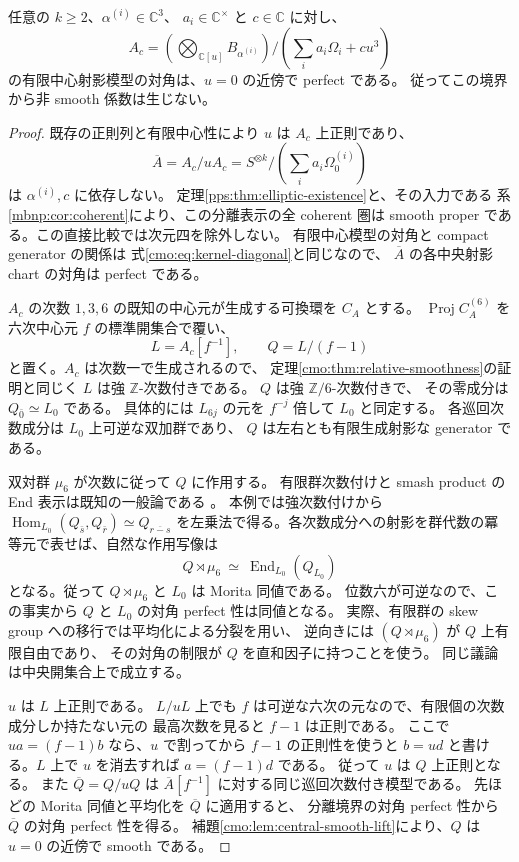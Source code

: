 \begin{proposition}[定数型混合族の全係数における射影境界]
\label{cmo:prop:projective-boundary-smooth}
任意の $k\ge2$、$\alpha^{(i)}\in\mathbb C^3$、
$a_i\in\mathbb C^\times$ と $c\in\mathbb C$ に対し、
\[
 A_c=\left(\bigotimes_{\mathbb C[u]}B_{\alpha^{(i)}}\right)
       \Big/\left(\sum_i a_i\Omega_i+cu^3\right)
\]
の有限中心射影模型の対角は、$u=0$ の近傍で perfect である。
従ってこの境界から非 smooth 係数は生じない。
\end{proposition}
\begin{proof}
既存の正則列と有限中心性により $u$ は $A_c$ 上正則であり、
\[
 \overline A=A_c/uA_c
   =S^{\otimes k}/\left(\sum_i a_i\Omega_0^{(i)}\right)
\]
は $\alpha^{(i)},c$ に依存しない。
定理\ref{pps:thm:elliptic-existence}と、その入力である
系\ref{mbnp:cor:coherent}により、この分離表示の全 coherent 圏は
smooth proper である。この直接比較では次元四を除外しない。
有限中心模型の対角と compact generator の関係は
式\eqref{cmo:eq:kernel-diagonal}と同じなので、
$\overline A$ の各中央射影 chart の対角は perfect である。

$A_c$ の次数 $1,3,6$ の既知の中心元が生成する可換環を $C_A$ とする。
$\operatorname{Proj}C_A^{(6)}$ を六次中心元 $f$ の標準開集合で覆い、
\[
 L=A_c[f^{-1}],\qquad Q=L/(f-1)
\]
と置く。$A_c$ は次数一で生成されるので、
定理\ref{cmo:thm:relative-smoothness}の証明と同じく $L$ は強 $\mathbb Z$-次数付きである。
$Q$ は強 $\mathbb Z/6$-次数付きで、
その零成分は $Q_{\bar0}\simeq L_0$ である。
具体的には $L_{6j}$ の元を $f^{-j}$ 倍して $L_0$ と同定する。
各巡回次数成分は $L_0$ 上可逆な双加群であり、
$Q$ は左右とも有限生成射影な generator である。

双対群 $\mu_6$ が次数に従って $Q$ に作用する。
有限群次数付けと smash product の End 表示は既知の一般論である
\cite[Theorems~1.3, 2.1]{CMONastasescuRodino}。
本例では強次数付けから
$\operatorname{Hom}_{L_0}(Q_{\bar s},Q_{\bar r})\simeq Q_{\overline{r-s}}$
を左乗法で得る。各次数成分への射影を群代数の冪等元で表せば、自然な作用写像は
\[
 Q\rtimes\mu_6\ \simeq\ \operatorname{End}_{L_0}(Q_{L_0})
\]
となる。従って $Q\rtimes\mu_6$ と $L_0$ は Morita 同値である。
位数六が可逆なので、この事実から
$Q$ と $L_0$ の対角 perfect 性は同値となる。
実際、有限群の skew group への移行では平均化による分裂を用い、
逆向きには $(Q\rtimes\mu_6)$ が $Q$ 上有限自由であり、
その対角の制限が $Q$ を直和因子に持つことを使う。
同じ議論は中央開集合上で成立する。

$u$ は $L$ 上正則である。
$L/uL$ 上でも $f$ は可逆な六次の元なので、有限個の次数成分しか持たない元の
最高次数を見ると $f-1$ は正則である。
ここで $ua=(f-1)b$ なら、$u$ で割ってから $f-1$ の正則性を使うと
$b=ud$ と書ける。$L$ 上で $u$ を消去すれば $a=(f-1)d$ である。
従って $u$ は $Q$ 上正則となる。
また $\overline Q=Q/uQ$ は $\overline A[f^{-1}]$ に対する同じ巡回次数付き模型である。
先ほどの Morita 同値と平均化を $\overline Q$ に適用すると、
分離境界の対角 perfect 性から $\overline Q$ の対角 perfect 性を得る。
補題\ref{cmo:lem:central-smooth-lift}により、$Q$ は $u=0$ の近傍で smooth である。


\end{proof}
